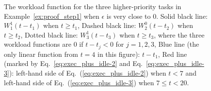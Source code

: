 \begin{figure}[t]
{    }
  \caption{\small The workload function for the three higher-priority tasks in Example~\ref{ex:proof_step1} when $\epsilon$ is very close to $0$. Solid black line: $W_1^1(t-t_1)$ when $t \geq t_1$, Dashed black line: $W_2^0(t-t_2)$ when $t \geq t_2$, Dotted black line: $W_3^1(t-t_3)$ when $t \geq t_3$, where the three workload functions are $0$ if $t-t_j < 0$ for $j=1,2,3$, Blue line (the only linear function from $t=4$ in this figure): $t-t_1$, Red line (marked by Eq.~\eqref{eq:exec_plus_idle-2} and Eq.~\eqref{eq:exec_plus_idle-3}): left-hand side of Eq.~(\ref{eq:exec_plus_idle-2}) when $t < 7$ and left-hand side of Eq.~(\ref{eq:exec_plus_idle-3}) when $ 7 \leq t < 20$.}
  \label{fig:example-step2}
\end{figure}




